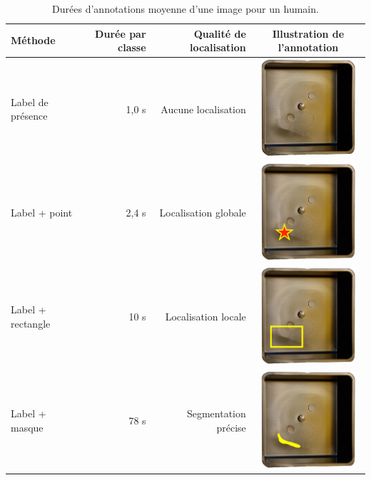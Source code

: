 \begin{table}[tb]
	\centering
	\begin{tabular}{|l|r|r|c|}
		\arrayrulecolor{black}
		\hline
		Méthode & Durée par classe & Qualité de localisation & Illustration de l'annotation\\
		\hline
		\hline
		Label de présence & 1,0 s & Aucune localisation & \includegraphics[width=3.5cm,keepaspectratio,valign=c,margin=1mm 1mm]{../Chap3/Figures/163-35_r.jpeg}
		\\
		\hline
		Label + point & 2,4 s & Localisation globale & \includegraphics[width=3.5cm,keepaspectratio,valign=c,margin=1mm 1mm]{../Chap3/Figures/163-35_r_point.jpeg} \\
		\hline
		Label + rectangle & 10 s & Localisation locale & \includegraphics[width=3.5cm,keepaspectratio,valign=c,margin=1mm 1mm]{../Chap3/Figures/163-35_r_box.jpeg} \\
		\hline
		Label + masque & 78 s & Segmentation précise & \includegraphics[width=3.5cm,keepaspectratio,valign=c,margin=1mm 1mm]{../Chap3/Figures/163-35_r_segm.jpeg} \\
		\hline
	\end{tabular}
	\caption{Durées d'annotations moyenne d'une image pour un humain.}
	\label{tab:annotation}
\end{table}

